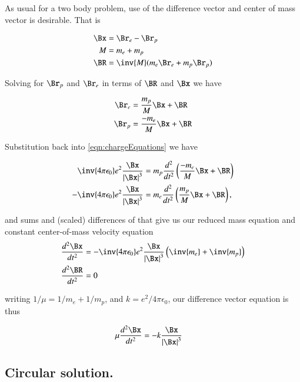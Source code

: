 \documentclass{article}
\newcommand{\K}[0]{\inv{4 \pi \epsilon_0}}
\begin{document}
As usual for a two body problem, use of the difference vector and center of mass vector is desirable.  That is

\begin{align*}
\Bx &= \Br_e - \Br_p \\
M &= m_e + m_p \\
\BR &= \inv{M}(m_e \Br_e + m_p \Br_p)
\end{align*}

Solving for $\Br_p$ and $\Br_e$ in terms of $\BR$ and $\Bx$ we have

\begin{align*}
\Br_e &= \frac{m_p}{M} \Bx + \BR \\
\Br_p &= \frac{-m_e}{M} \Bx + \BR \\
\end{align*}


Substitution back into \ref{eqn:chargeEquations} we have

\begin{align*}
  \K e^2 \frac {\Bx} { \Abs{\Bx}^3 } &= m_p \frac{d^2}{dt^2}\left( \frac{-m_e}{M} \Bx + \BR \right) \\
 -\K e^2 \frac {\Bx} { \Abs{\Bx}^3 } &= m_e \frac{d^2}{dt^2}\left( \frac{m_p}{M} \Bx + \BR \right),
\end{align*}

and sums and (scaled) differences of that give us our reduced mass equation and constant center-of-mass velocity equation
\begin{align}
\frac{d^2 \Bx}{dt^2} &= -\K e^2 \frac {\Bx} { \Abs{\Bx}^3 } \left( \inv{m_e} + \inv{m_p} \right) \\
\frac{d^2 \BR}{dt^2} &= 0
\end{align}

writing $1/\mu = 1/m_e + 1/m_p$, and $k = e^2/4 \pi \epsilon_0$, our difference vector equation is thus

\begin{align}\label{eqn:reduceEOM}
\mu \frac{d^2 \Bx}{dt^2} &= -k \frac {\Bx} { \Abs{\Bx}^3 }
\end{align}

\subsection{ Circular solution. }
\end{document}
